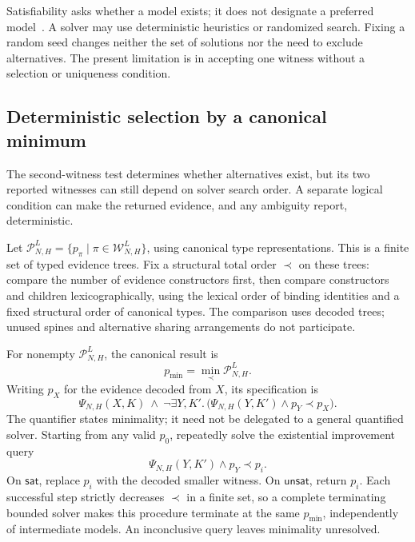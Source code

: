 \documentclass[10pt,a4paper]{article}
\begin{document}
Satisfiability asks whether a model exists; it does not designate a preferred
model~\cite{smt-standard}. A solver may use deterministic heuristics or randomized
search. Fixing a random seed changes neither the set of solutions nor the need
to exclude alternatives. The present limitation is in accepting one witness
without a selection or uniqueness condition.

\subsection{Deterministic selection by a canonical minimum}
\label{sec:canonical-evidence}
The second-witness test determines whether alternatives exist, but its two
reported witnesses can still depend on solver search order. A separate logical
condition can make the returned evidence, and any ambiguity report, deterministic.

Let $\mathcal P^L_{N,H}=\{p_\pi\mid\pi\in\mathcal W^L_{N,H}\}$, using
canonical type representations. This is a finite set of typed evidence trees.
Fix a structural total order $\prec$ on these trees: compare the number of
evidence constructors first, then compare constructors and children
lexicographically, using the lexical order of binding identities and a fixed
structural order of canonical types. The comparison uses decoded trees;
unused spines and alternative sharing arrangements do not participate.

For nonempty $\mathcal P^L_{N,H}$, the canonical result is
\[
 p_{\min}=\min_{\prec}\mathcal P^L_{N,H}.
\]
Writing $p_X$ for the evidence decoded from $X$, its specification is
\[
 \Psi_{N,H}(X,K)\ \land\
 \neg\exists Y,K'.\,
   \bigl(\Psi_{N,H}(Y,K')\land p_Y\prec p_X\bigr).
\]
The quantifier states minimality; it need not be delegated to a general
quantified solver. Starting from any valid $p_0$, repeatedly solve the
existential improvement query
\[
 \Psi_{N,H}(Y,K')\land p_Y\prec p_i.
\]
On $\mathsf{sat}$, replace $p_i$ with the decoded smaller witness.
On $\mathsf{unsat}$, return $p_i$. Each successful step strictly decreases
$\prec$ in a finite set, so a complete terminating bounded solver makes this
procedure terminate at the same $p_{\min}$, independently of intermediate
models. An inconclusive query leaves minimality unresolved.
\end{document}

